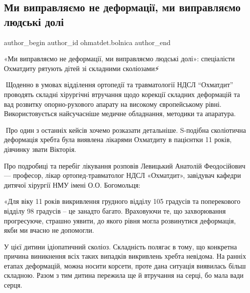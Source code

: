  
 
 
 
 
 
\subsection{Ми виправляємо не деформації, ми виправляємо людські долі}
\label{sec:15_12_2022.fb.ohmatdet.bolnica.1.deformacii}
 
\ifcmt
 author_begin
   author_id ohmatdet.bolnica
 author_end
\fi


«Ми виправляємо не деформації, ми виправляємо людські долі»: спеціалісти
Охматдиту рятують дітей зі складними сколіозами⚡️

🔻Щоденно в умовах відділення ортопедії та травматології НДСЛ “Охматдит”
проводять складні хірургічні втручання щодо корекції складних деформацій та вад
розвитку опорно-рухового апарату на високому європейському рівні.
Використовується найсучасніше медичне обладнання, методики та апаратура.

🔻Про один з останніх кейсів хочемо розказати детальніше. S-подібна сколіотична
деформація хребта була виявлена лікарями Охматдиту в пацієнтки 11 років,
дівчинку звати Вікторія.

Про подробиці та перебіг лікування розповів Левицький Анатолій Феодосійович —
професор, лікар ортопед-травматолог НДСЛ «Охматдит», завідувач кафедри дитячої
хірургії НМУ імені О.О. Богомольця:

«Для віку 11 років викривлення грудного відділу 105 градусів та поперекового
відділу 98 градусів – це занадто багато. Враховуючи те, що захворювання
прогресуюче, страшно уявити, до якого рівня могла розвинутися деформація, якби
ми вчасно не допомогли. 

У цієї дитини ідіопатичний сколіоз. Складність полягає в тому, що конкретна
причина виникнення всіх таких випадків викривлень хребта невідома. На ранніх
етапах деформацій, можна носити корсети, проте дана ситуація виявилась більш
складною. Разом з тим дитина пережила ще й втручання на серці, бо мала вади
серця.

